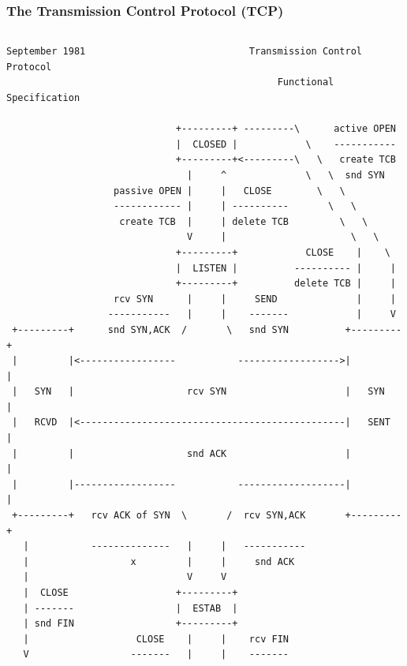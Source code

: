 \begin{frame}[fragile]
  \frametitle{The Transmission Control Protocol (TCP)}

  \begin{columns}[T]

  \begin{Tiny}
    \begin{verbatim}
September 1981                             Transmission Control Protocol
                                                Functional Specification

                              +---------+ ---------\      active OPEN  
                              |  CLOSED |            \    -----------  
                              +---------+<---------\   \   create TCB  
                                |     ^              \   \  snd SYN    
                   passive OPEN |     |   CLOSE        \   \           
                   ------------ |     | ----------       \   \         
                    create TCB  |     | delete TCB         \   \       
                                V     |                      \   \     
                              +---------+            CLOSE    |    \   
                              |  LISTEN |          ---------- |     |  
                              +---------+          delete TCB |     |  
                   rcv SYN      |     |     SEND              |     |  
                  -----------   |     |    -------            |     V  
 +---------+      snd SYN,ACK  /       \   snd SYN          +---------+
 |         |<-----------------           ------------------>|         |
 |   SYN   |                    rcv SYN                     |   SYN   |
 |   RCVD  |<-----------------------------------------------|   SENT  |
 |         |                    snd ACK                     |         |
 |         |------------------           -------------------|         |
 +---------+   rcv ACK of SYN  \       /  rcv SYN,ACK       +---------+
   |           --------------   |     |   -----------                  
   |                  x         |     |     snd ACK                    
   |                            V     V                                
   |  CLOSE                   +---------+                              
   | -------                  |  ESTAB  |                              
   | snd FIN                  +---------+                              
   |                   CLOSE    |     |    rcv FIN                     
   V                  -------   |     |    -------                     

\end{verbatim}
\end{Tiny}
\end{columns}
\end{frame}
